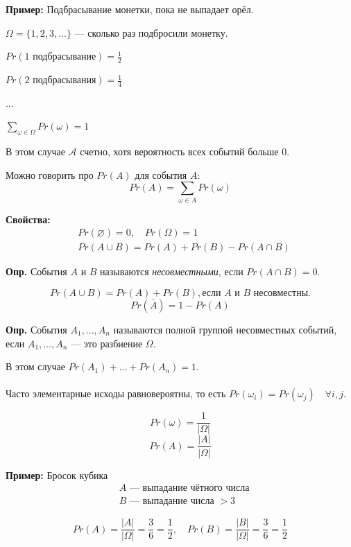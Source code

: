 \documentclass[10pt, a4paper]{article}
\begin{document}
\vspace{0.5em}
\noindent
\textbf{Пример:} Подбрасывание монетки, пока не выпадает орёл.

\noindent
$\Omega = \{1, 2, 3, \dots\}$ — сколько раз подбросили монетку.

\noindent
$Pr(\text{1 подбрасывание}) = \frac{1}{2}$

\noindent
$Pr(\text{2 подбрасывания}) = \frac{1}{4}$

\noindent
$\dots$

\noindent
$\sum_{\omega \in \Omega} Pr(\omega) = 1$

\noindent
В этом случае $\mathcal{A}$ счетно, хотя вероятность всех событий больше 0.

\vspace{0.5em}
\noindent Можно говорить про $Pr(A)$ для события $A$:
\[
Pr(A) = \sum_{\omega \in A} Pr(\omega)
\]

\noindent
\textbf{Свойства:} 
\begin{align*}
& Pr(\varnothing) = 0, \quad Pr(\Omega) = 1 \\
& Pr(A \cup B) = Pr(A) + Pr(B) - Pr(A \cap B)
\end{align*}

\vspace{0.5em}
\noindent
\textbf{Опр.} События $A$ и $B$ называются \textit{несовместными}, если $Pr(A \cap B) = 0$.

$$Pr(A \cup B) = Pr(A) + Pr(B), \text{если $A$ и $B$ несовместны}.$$
$$Pr(\bar{A}) = 1 - Pr(A)$$

\vspace{0.5em}
\noindent
\textbf{Опр.} События $A_1, \dots, A_n$ называются полной группой несовместных событий, если $A_1, \dots, A_n$ --- это разбиение $\Omega$.

\noindent
В этом случае $Pr(A_1) + \dots + Pr(A_n) = 1$.
\\\\
Часто элементарные исходы равновероятны, то есть $Pr(\omega_i) = Pr(\omega_j) \quad \forall i, j$.

\[
Pr(\omega) = \frac{1}{|\Omega|}
\]
\[
Pr(A) = \frac{|A|}{|\Omega|}
\]

\vspace{0.5em}
\noindent
\textbf{Пример:} Бросок кубика
\begin{align*}
& A \text{ — выпадание чётного числа} \\
& B \text{ — выпадание числа } > 3
\end{align*}

\[
Pr(A) = \frac{|A|}{|\Omega|} = \frac{3}{6} = \frac{1}{2}, \quad Pr(B) = \frac{|B|}{|\Omega|} = \frac{3}{6} = \frac{1}{2}
\]
\end{document}
